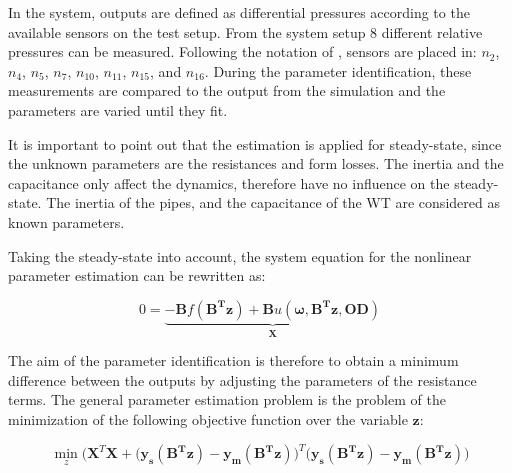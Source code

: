 In the system, outputs are defined as differential pressures according to the available sensors on the test setup. From the system setup $8$ different relative pressures can be measured. Following the notation of , sensors are placed in: 
$n_2$, $n_4$, $n_5$, $n_7$, $n_{10}$, $n_{11}$, $n_{15}$, and  $n_{16}$. During the parameter identification, these measurements are compared to the output from the simulation and the parameters are varied until they fit.

It is important to point out that the estimation is applied for steady-state, since the unknown parameters are the resistances and form losses. The inertia and the capacitance only affect the dynamics, therefore have no influence on the steady-state. The inertia of the pipes, and the capacitance of the WT are considered as known parameters. 

Taking the steady-state into account, the system equation for the nonlinear parameter estimation can be rewritten as: 

\begin{equation}
 0 = \underbrace {-\bm{B} f(\bm{B^T}\bm{z}) + \bm{B} u(\bm{\omega},\bm{B^T}\bm{z},\bm{OD}) }_{\mathcal{\bm{X}}}
 \label{InputOutputmodel_steadystate}
\end{equation}

The aim of the parameter identification is therefore to obtain a minimum difference between the outputs by adjusting the parameters of the resistance terms. The general parameter estimation problem is the problem of the minimization of the following objective function over the variable $\bm{z}$: 

%
%
 \begin{equation}
 \min_{z} \Big(\mathcal{\bm{X}}^T \mathcal{\bm{X}} + \big(\bm{y_{s}(B^T z)} - \bm{y_{m}(B^T z)} \big)^T  \big(\bm{ y_{s}(B^T z)} - \bm{ y_{m}(B^T z)}\big)
  \label{ObjectiveFunction11}
 \end{equation}
 

